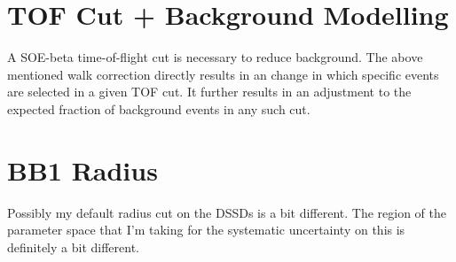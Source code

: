 \section{TOF Cut + Background Modelling}
	A SOE-beta time-of-flight cut is necessary to reduce background.  The above mentioned walk correction directly results in an change in which specific events are selected in a given TOF cut.  It further results in an adjustment to the expected fraction of background events in any such cut.
	
\section{BB1 Radius}
	Possibly my default radius cut on the DSSDs is a bit different.  The region of the parameter space that I'm taking for the systematic uncertainty on this is definitely a bit different.  
	
